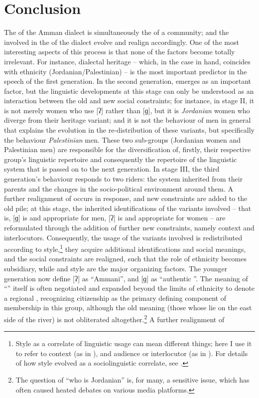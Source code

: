 \documentclass[output=paper]{langsci/langscibook}
\begin{document}
\section{Conclusion}

The  of the Amman dialect is simultaneously the  of a community; and the  involved in the  of the dialect evolve and realign accordingly. One of the most interesting aspects of this process is that none of the factors become totally irrelevant. For instance, dialectal heritage – which, in the case in hand, coincides with ethnicity ({Jordanian}/Palestinian) – is the most important predictor in the speech of the first generation. In the second generation,  emerges as an important factor, but the linguistic developments at this stage can only be understood as an interaction between the old and new social constraints; for instance, in stage II, it is not merely women who use [ʔ] rather than [ɡ], but it is \textit{Jordanian} women who diverge from their heritage variant; and it is not the behaviour of men in general that explains the evolution in the re-distribution of these variants, but specifically the behaviour \textit{Palestinian} men. These two sub-groups (Jordanian women and Palestinian men) are responsible for the diversification of, firstly, their respective group’s linguistic repertoire and consequently the repertoire of the linguistic system that is passed on to the next generation. In stage III, the third generation’s behaviour responds to two riders: the system inherited from their parents and the changes in the socio-political environment around them. A further realignment of  occurs in response, and new constraints are added to the old pile; at this stage, the inherited identifications of the variants involved – that is, [ɡ] is  and appropriate for men, [ʔ] is  and appropriate for women – are reformulated through the addition of further new constraints, namely context and interlocutors. Consequently, the usage of the variants involved is redistributed according to style,\footnote{Style as a correlate of linguistic usage can mean different things; here I use it to refer to context (as in \citealt{Labov1972}), and audience or interlocutor (as in \citealt{Bell1984}). For details of how style evolved as a sociolinguistic correlate, see \citet{EckertRickford2001}.} they acquire additional identifications and social meanings, and the social constraints are realigned, such that the role of ethnicity becomes subsidiary, while  and style are the major organizing factors. The younger generation now define [ʔ] as ``Ammani'', and [ɡ] as ``authentic ''. The meaning of ``'' itself is often negotiated and expanded beyond the limits of ethnicity to denote a regional , recognizing citizenship as the primary defining component of membership in this group, although the old meaning (those whose  lie on the east side of the river) is not obliterated altogether.\footnote{The question of “who is Jordanian” is, for many, a sensitive issue, which has often caused heated debates on various media platforms.} A further realignment of  
\end{document}
